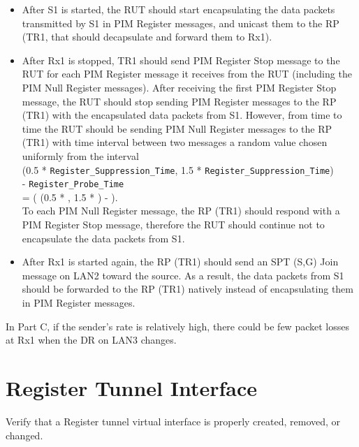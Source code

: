 \documentclass[11pt]{report}
\begin{document}
\begin{itemize}

  \item After S1 is started, the RUT should start
  encapsulating the data packets transmitted by S1 in PIM Register messages,
  and unicast them to the RP (TR1, that should decapsulate and forward them to
  Rx1).

  \item After Rx1 is stopped, TR1 should send PIM Register Stop message to
  the RUT for each PIM Register message it receives from the RUT (including
  the PIM Null Register messages). After receiving the first PIM Register Stop
  message, the RUT should stop sending PIM Register messages to the RP (TR1)
  with the encapsulated data packets from S1.
  However, from time to time the RUT should be sending PIM Null Register
  messages to the RP (TR1) with time interval between two messages a random
  value chosen uniformly from the interval \\
  (0.5 * \verb=Register_Suppression_Time=,
  1.5 * \verb=Register_Suppression_Time=) \\
  - \verb=Register_Probe_Time= \\
  = ( (0.5 * {\PimsmRegisterSuppressionTime}, 1.5 *
  {\PimsmRegisterSuppressionTime}) - {\PimsmRegisterProbeTime} ). \\
  To each PIM Null Register message, the RP (TR1) should respond with a PIM
  Register Stop message, therefore the RUT should continue not to encapsulate
  the data packets from S1.

  \item After Rx1 is started again, the RP (TR1) should send an SPT (S,G) Join
  message on LAN2 toward the source. As a result, the data packets from S1
  should be forwarded to the RP (TR1) natively instead of encapsulating them
  in PIM Register messages.

\end{itemize}


In Part C, if the sender's rate is relatively high, there could be few packet
losses at Rx1 when the DR on LAN3 changes.

\newpage
\section{Register Tunnel Interface}

Verify that a Register tunnel virtual interface is properly created, removed,
or changed.
\end{document}
